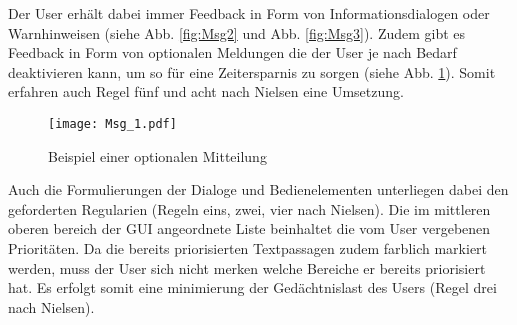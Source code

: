 Der User erh{\"a}lt dabei immer Feedback in Form von
Informationsdialogen oder Warnhinweisen (siehe Abb. \ref{fig:Msg2} und Abb.
\ref{fig:Msg3}). Zudem gibt es Feedback in Form von optionalen Meldungen die der
User je nach Bedarf deaktivieren kann, um so f{\"u}r eine Zeitersparnis zu
sorgen (siehe Abb. \ref{fig:Msg1}). Somit erfahren auch Regel f{\"u}nf und acht
nach Nielsen eine Umsetzung.

\begin{figure}[H]
\centering
\texttt{[image: Msg\_1.pdf]}
\caption{Beispiel einer optionalen Mitteilung}
\label{fig:Msg1}
\end{figure}

Auch die Formulierungen der Dialoge und Bedienelementen unterliegen dabei den
geforderten Regularien (Regeln eins, zwei, vier nach Nielsen). Die im mittleren
oberen bereich der GUI angeordnete Liste beinhaltet die vom User vergebenen
Priorit{\"a}ten. Da die bereits priorisierten Textpassagen zudem farblich
markiert werden, muss der User sich nicht merken welche Bereiche er bereits priorisiert
hat. Es erfolgt somit eine minimierung der Ged{\"a}chtnislast des Users
(Regel drei nach Nielsen).

